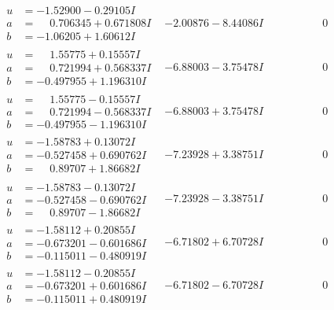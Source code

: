 \documentclass[1p]{elsarticle_modified}
\theoremstyle{definition}
\begin{document}
$$\begin{array}{c|c|c}
\begin{aligned}
u &= -1.52900 - 0.29105 I \\
a &= \phantom{-}0.706345 + 0.671808 I \\
b &= -1.06205 + 1.60612 I\end{aligned}
 & -2.00876 - 8.44086 I & \phantom{-0.000000 } 0 \\ \hline\begin{aligned}
u &= \phantom{-}1.55775 + 0.15557 I \\
a &= \phantom{-}0.721994 + 0.568337 I \\
b &= -0.497955 + 1.196310 I\end{aligned}
 & -6.88003 - 3.75478 I & \phantom{-0.000000 } 0 \\ \hline\begin{aligned}
u &= \phantom{-}1.55775 - 0.15557 I \\
a &= \phantom{-}0.721994 - 0.568337 I \\
b &= -0.497955 - 1.196310 I\end{aligned}
 & -6.88003 + 3.75478 I & \phantom{-0.000000 } 0 \\ \hline\begin{aligned}
u &= -1.58783 + 0.13072 I \\
a &= -0.527458 + 0.690762 I \\
b &= \phantom{-}0.89707 + 1.86682 I\end{aligned}
 & -7.23928 + 3.38751 I & \phantom{-0.000000 } 0 \\ \hline\begin{aligned}
u &= -1.58783 - 0.13072 I \\
a &= -0.527458 - 0.690762 I \\
b &= \phantom{-}0.89707 - 1.86682 I\end{aligned}
 & -7.23928 - 3.38751 I & \phantom{-0.000000 } 0 \\ \hline\begin{aligned}
u &= -1.58112 + 0.20855 I \\
a &= -0.673201 - 0.601686 I \\
b &= -0.115011 - 0.480919 I\end{aligned}
 & -6.71802 + 6.70728 I & \phantom{-0.000000 } 0 \\ \hline\begin{aligned}
u &= -1.58112 - 0.20855 I \\
a &= -0.673201 + 0.601686 I \\
b &= -0.115011 + 0.480919 I\end{aligned}
 & -6.71802 - 6.70728 I & \phantom{-0.000000 } 0 \\ \hline\begin{aligned}

\end{aligned}
\end{array}$$
\end{document}
